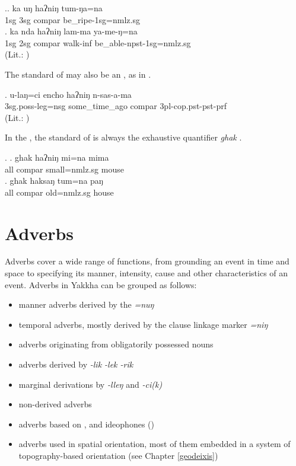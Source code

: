 \ex.\ag. ka uŋ haʔniŋ  tum-ŋa=na\\
			{\sc 1sg} {\sc 3sg}  {\sc compar} be\_ripe-{\sc 1sg=nmlz.sg}	\\
	 \bg.  ka nda haʔniŋ lam-ma ya-me-ŋ=na\\
			{\sc 1sg} {\sc 2sg}  {\sc compar}  walk{\sc -inf} be\_able{\sc -npst-1sg=nmlz.sg}\\
	 (Lit.: )
	
The standard of  may also be an , as in \Next. 

\exg. u-laŋ=ci encho haʔniŋ n-sas-a-ma\\
		{\sc 3sg.poss}-leg{\sc =nsg} some\_time\_ago {\sc compar} {\sc 3pl-cop.pst-pst-prf}\\
	 (Lit.: )

In the , the standard of  is always the exhaustive quantifier \emph{ghak}  \Next. 

\ex. \ag. ghak haʔniŋ mi=na  mima\\
	all {\sc compar} small{\sc =nmlz.sg} mouse\\
 
\bg. ghak haksaŋ tum=na  paŋ\\
all  {\sc compar} old{\sc =nmlz.sg} house\\
 


\section{Adverbs}\label{adv}

Adverbs cover a wide range of functions, from grounding an event in time and space to specifying its manner, intensity, cause and other characteristics of an event. Adverbs in Yakkha can be grouped as follows:

\begin{itemize}
\item manner adverbs derived by the  \emph{=nuŋ}
\item temporal adverbs, mostly derived by the clause linkage marker  \emph{=niŋ} 
\item adverbs originating from obligatorily possessed nouns
\item adverbs derived by \emph{-lik \ti -lek \ti -rik}
\item marginal derivations by \emph{-lleŋ} and \emph{-ci(k)}
\item non-derived adverbs
\item adverbs based on ,  and ideophones ()
\item adverbs used in spatial orientation, most of them embedded in a system of topography-based orientation (see Chapter \ref{geodeixis})
\end{itemize}

